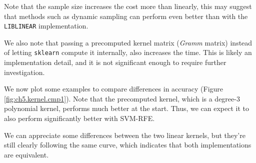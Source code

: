 Note that the sample size increases the cost more than linearly, this may suggest that methods such as dynamic sampling can perform even better than with the \texttt{LIBLINEAR} implementation.

We also note that passing a precomputed kernel matrix (\emph{Gramm} matrix) instead of letting \texttt{sklearn} compute it internally, also increases the time. This is likely an implementation detail, and it is not significant enough to require further in\-ves\-ti\-ga\-tion.

We now plot some examples to compare differences in accuracy (Figure \ref{fig:ch5.kernel.cmp1}). Note that the precomputed kernel, which is a degree-3 polynomial kernel, performs much better at the start. Thus, we can expect it to also perform significantly better with SVM-RFE. 

We can appreciate some differences between the two linear kernels, but they're still clearly following the same curve, which indicates that both implementations are equivalent.  

